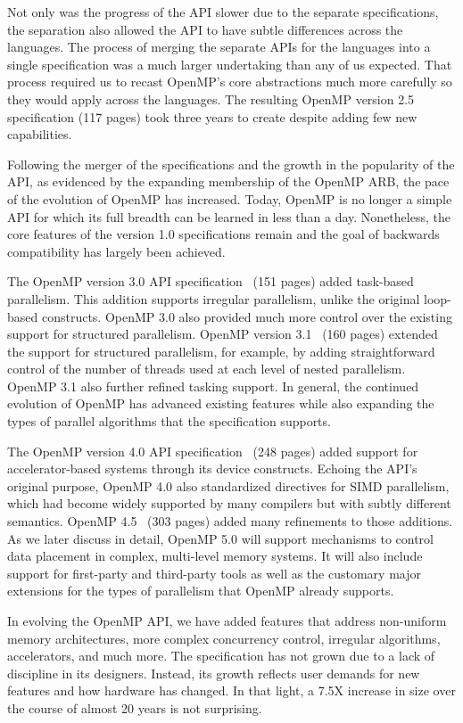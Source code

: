 Not only was the progress of the API slower due to the separate 
specifications, the separation also allowed the API to have subtle 
differences across the languages. The process of merging the separate
APIs for the languages into a single  specification was a much larger 
undertaking than any of us expected. That process required us to recast 
OpenMP's core abstractions much more carefully so they would apply across 
the languages. The resulting OpenMP version 2.5 specification (117 pages)
took three years to create despite adding few new capabilities.

Following the merger of the specifications and the growth in the popularity
of the API, as evidenced by the expanding membership of the OpenMP ARB,
the pace of the evolution of OpenMP has increased. Today, OpenMP is no 
longer a simple API for which its full breadth can be learned in less 
than a day. Nonetheless, the core features of the version 1.0 specifications
remain and the goal of backwards compatibility has largely been achieved.

The OpenMP version 3.0 API specification~\cite{openmp3} (151 pages) added
task-based parallelism. This addition supports irregular parallelism, unlike 
the original loop-based constructs. OpenMP 3.0 also provided much more control
over the existing support for structured parallelism. OpenMP 
version 3.1~\cite{openmp31} (160 pages) extended the support for structured 
parallelism, for example, by adding straightforward control of the number of 
threads used at each level of nested parallelism. OpenMP 3.1 also further 
refined tasking support. In general, the continued evolution of OpenMP has 
advanced existing features while also expanding the types of parallel 
algorithms that the specification supports.

The OpenMP version 4.0 API specification~\cite{openmp4} (248 pages) added 
support for accelerator-based systems through its device constructs. Echoing 
the API's original purpose, OpenMP 4.0 also standardized directives for SIMD 
parallelism, which had become widely supported by many compilers but with 
subtly different semantics. OpenMP 4.5~\cite{openmp45} (303 pages) added many 
refinements to those additions. As we later discuss in detail, OpenMP 5.0 will
support mechanisms to control data placement in complex, multi-level memory 
systems. It will also include support for first-party and third-party tools 
as well as the customary major extensions for the types of parallelism that
OpenMP already supports.

In evolving the OpenMP API, we have added features that address 
non-uniform memory architectures, more complex concurrency control, 
irregular algorithms, accelerators, and much more. The specification 
has not grown due to a lack of discipline in its designers. Instead,
its growth reflects user demands for new features and how hardware 
has changed. In that light, a 7.5X increase in size over the course 
of almost 20 years is not surprising.

